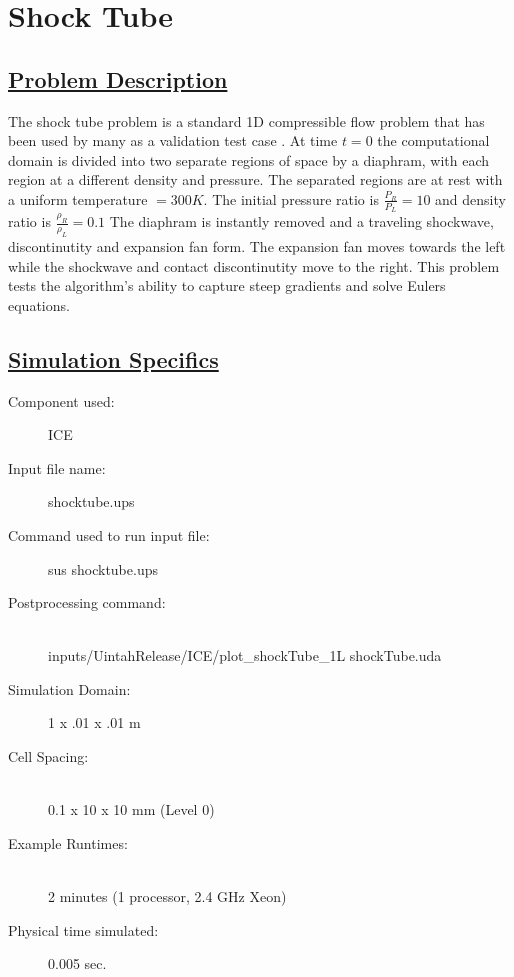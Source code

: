 \documentclass[fleqn]{article}
\begin{document}
\section*{\center Shock Tube}
\subsection*{\underline{Problem Description}}
The shock tube problem is a standard 1D compressible flow problem that has been used by many as a
validation test case \cite{laney, sod, toro}.  At time $t=0$ the computational domain is divided
into two separate regions of space by a diaphram, with each region at a different density and
pressure.  The separated regions are at rest with a uniform temperature $=300K$.  The initial
pressure ratio is $\frac{P_R}{P_L}  = 10$ and density ratio is $\frac{\rho_R}{\rho_L} = 0.1$  The
diaphram is instantly removed and a traveling shockwave, discontinutity and expansion fan form.  The
expansion fan moves towards the left while the shockwave and contact discontinutity move to the
right.  This problem tests the algorithm's ability to capture steep gradients and solve Eulers equations. 
 
\subsection*{\underline{Simulation Specifics}}
\begin{description} 
\item [Component used:] \hfill ICE
\item [Input file name:] \hfill shocktube.ups
\item [Command used to run input file:]\hfill sus shocktube.ups
\item [Postprocessing command:]\hfill \\
inputs/UintahRelease/ICE/plot\_shockTube\_1L shockTube.uda

\item [Simulation Domain:]\hfill    1 x .01 x .01 m
\item [Cell Spacing:]\hfill \\ 
0.1 x 10 x 10 mm (Level 0)

\item [Example Runtimes:] \hfill \\
 2 minutes   (1 processor, 2.4 GHz Xeon)

\item [Physical time simulated:] \hfill 0.005 sec.

\end{description}
\end{document}
